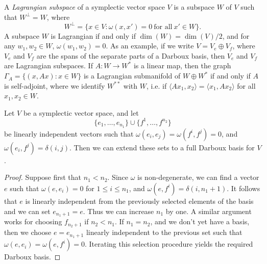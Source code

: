 A \emph{Lagrangian subspace} of a symplectic vector space $V$ is a subspace $W$ of $V$ such that $W^\perp = W$, where
%
\[ W^\perp = \{ x \in V : \omega(x,x') = 0\ \text{for all}\ x' \in W \}. \]
%
A subspace $W$ is Lagrangian if and only if $\dim(W) = \dim(V) / 2$, and for any $w_1,w_2 \in W$, $\omega(w_1,w_2) = 0$. As an example, if we write $V = V_e \oplus V_f$, where $V_e$ and $V_f$ are the spans of the separate parts of a Darboux basis, then $V_e$ and $V_f$ are Lagrangian subspaces. If $A: W \to W^*$ is a linear map, then the graph $\Gamma_A = \{ (x,Ax) : x \in W \}$ is a Lagrangian submanifold of $W \oplus W^*$ if and only if $A$ is self-adjoint, where we identify $W^{**}$ with $W$, i.e. if $\langle Ax_1, x_2 \rangle = \langle x_1, Ax_2 \rangle$ for all $x_1,x_2 \in W$.

\begin{lemma}
    Let $V$ be a symplectic vector space, and let
    \[ \{ e_1, \dots, e_{n_1} \} \cup \{ f^1, \dots, f^{n_2} \} \]
    be linearly independent vectors such that $\omega(e_i,e_j) = \omega(f^i,f^j) = 0$, and $\omega(e_i,f^j) = \delta(i,j)$. Then we can extend these sets to a full Darboux basis for $V$.
\end{lemma}
\begin{proof}
    Suppose first that $n_1 < n_2$. Since $\omega$ is non-degenerate, we can find a vector $e$ such that $\omega(e,e_i) = 0$ for $1 \leq i \leq n_1$, and $\omega(e,f^i) = \delta(i,n_1 + 1)$. It follows that $e$ is linearly independent from the previously selected elements of the basis and we can set $e_{n_1 + 1} = e$. Thus we can increase $n_1$ by one. A similar argument works for choosing $f_{n_2 + 1}$ if $n_2 < n_1$. If $n_1 = n_2$, and we don't yet have a basis, then we choose $e = e_{n_1 + 1}$ linearly independent to the previous set such that $\omega(e,e_i) = \omega(e,f^i) = 0$. Iterating this selection procedure yields the required Darboux basis.
\end{proof}

